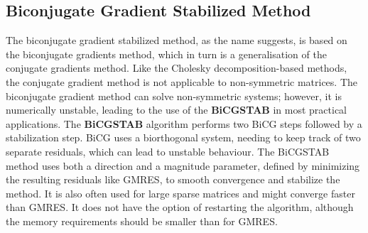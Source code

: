\subsection{Biconjugate Gradient Stabilized Method}
The biconjugate gradient stabilized method, as the name suggests, is based on the biconjugate gradients method, which in turn is a generalisation of the conjugate gradients method. Like the Cholesky decomposition-based methods, the conjugate gradient method is not applicable to non-symmetric matrices. The biconjugate gradient method can solve non-symmetric systems; however, it is numerically unstable, leading to the use of the \textbf{BiCGSTAB} in most practical applications. The \textbf{BiCGSTAB} algorithm performs two BiCG steps followed by a stabilization step. BiCG uses a biorthogonal system, needing to keep track of two separate residuals, which can lead to unstable behaviour. The BiCGSTAB method uses both a direction and a magnitude parameter, defined by minimizing the resulting residuals like GMRES, to smooth convergence and stabilize the method. It is also often used for large sparse matrices \cite{yang_improved_2002,krasnopolsky_revisiting_2020} and might converge faster than GMRES. It does not have the option of restarting the algorithm, although the memory requirements should be smaller than for GMRES. 

